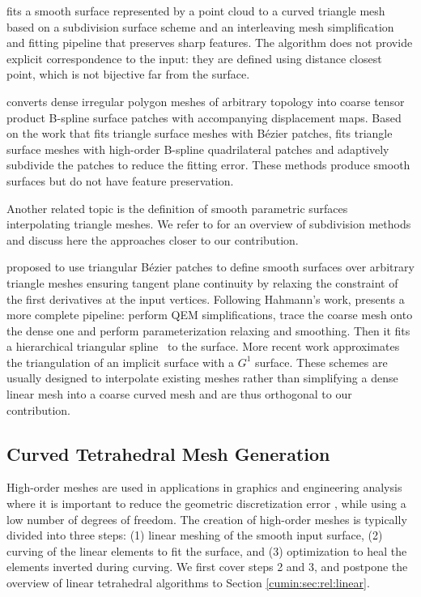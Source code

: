 \cite{hoppe1994piecewise} fits a smooth surface represented by a point cloud to a curved triangle mesh based on a subdivision surface scheme and an interleaving mesh simplification and fitting pipeline that preserves sharp features. 
The algorithm does not provide explicit correspondence to the input: they are defined using distance closest point, which is not bijective far from the surface. 

\cite{krishnamurthy1996fitting} converts dense irregular polygon meshes of arbitrary topology into coarse tensor product B-spline surface patches with accompanying displacement maps. Based on the work \cite{LIN2007adap} that fits triangle surface meshes with B\'ezier patches, \cite{Zhang2011multi} fits triangle surface meshes with high-order B-spline quadrilateral patches and adaptively subdivide the patches to reduce the fitting error. These methods produce smooth surfaces but do not have feature preservation.

Another related topic is the definition of smooth parametric surfaces interpolating triangle meshes. We refer to \cite{zorin2000subdivision} for an overview of subdivision methods and discuss here the approaches closer to our contribution.

\cite{Hahmann2003} proposed to use triangular B{\'e}zier patches to define smooth surfaces over arbitrary triangle meshes ensuring tangent plane continuity by relaxing the constraint of the first derivatives at the input vertices.
%
Following Hahmann's work, \cite{yvart2005smooth} presents a more complete pipeline: perform QEM simplifications, trace the coarse mesh onto the dense one and perform parameterization relaxing and smoothing. Then it fits a hierarchical triangular spline~\cite{Yvart2005hier} to the surface.
%
More recent work \cite{TONG2009} approximates the triangulation of an implicit surface with a $G^1$ surface.
%
These schemes are usually designed to interpolate existing meshes rather than simplifying a dense linear mesh into a coarse curved mesh and are thus orthogonal to our contribution.

\subsection{Curved Tetrahedral Mesh Generation}

High-order meshes are used in applications in graphics \cite{bargteil2014animation,MEZGER2009680,Suwelack2013} and engineering analysis \cite{Jameson2002} where it is important to reduce the geometric discretization error \cite{Babuska1988,BABUSKA1992159,BASSI1997251,luo2001influence,ODEN1994309}, while using a low number of degrees of freedom. The creation of high-order meshes is typically divided into three steps: (1) linear meshing of the smooth input surface, (2) curving of the linear elements to fit the surface, and (3) optimization to heal the elements inverted during curving. We first cover steps 2 and 3, and postpone the overview of linear tetrahedral algorithms to Section \ref{cumin:sec:rel:linear}.

